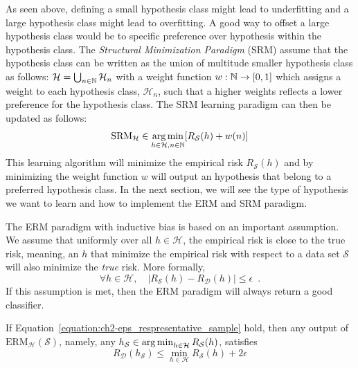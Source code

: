 As seen above, defining a small hypothesis class might lead to underfitting and a large hypothesis class might lead to overfitting.
A good way to offset a large hypothesis class would be to specific preference over hypothesis within the hypothesis class.
The \emph{Structural Minimization Paradigm} (SRM) assume that the hypothesis class can be written as the union of multitude smaller hypothesis class as follows: $\mathcal{H} = \bigcup_{n \in \mathbb{N}} \mathcal{H}_n$ with a weight function $w: \mathbb{N} \rightarrow [0, 1]$ which assigns a weight to each hypothesis class, $\mathcal{H}_n$, such that a higher weights reflects a lower preference for the hypothesis class.
The SRM learning paradigm can then be updated as follows:
\begin{equation}
  \text{SRM}_\mathcal{H} \in \argmin_{h \in \mathcal{H}, n \in \Nbb} \left[ R_\mathcal{S}(h) + w(n) \right]
\end{equation}
This learning algorithm will minimize the empirical risk $R_\mathcal{S}(h)$ and by minimizing the weight function $w$ will output an hypothesis that belong to a preferred hypothesis class. 
In the next section, we will see the type of hypothesis we want to learn and how to implement the ERM and SRM paradigm.




\drawline






\drawline




The ERM paradigm with inductive bias is based on an important assumption.
We assume that uniformly over all $h \in \mathcal{H}$, the empirical risk is close to the true risk, meaning, an $h$ that minimize the empirical risk with respect to a data set $\mathcal{S}$ will also minimize the \emph{true} risk.
More formally, 
\begin{equation}
  \forall h \in \mathcal{H}, \quad \left| R_\mathcal{S}(h) - R_\mathcal{D}(h) \right| \leq \epsilon \enspace.
  \label{equation:ch2-eps_respresentative_sample} 
\end{equation}
If this assumption is met, then the ERM paradigm will always return a good classifier. 
\begin{lemma} 
  If Equation~\ref{equation:ch2-eps_respresentative_sample} hold, then any output of $\mathrm{ERM}_\mathcal{H}(\mathcal{S})$, namely, any $h_\mathcal{S} \in \operatorname*{arg\,min}_{h \in \mathcal{H}} R_\mathcal{S}(h)$, satisfies
  \begin{equation}
    R_\mathcal{D}(h_\mathcal{S}) \leq \min_{h \in \mathcal{H}} R_\mathcal{S}(h) + 2\epsilon
  \end{equation}
\end{lemma}









